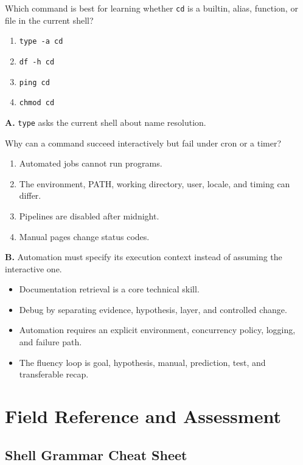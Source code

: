 \documentclass[11pt,oneside,openany]{book}
\newcommand{\fourchoices}[4]{%
  \begin{enumerate}[label=\Alph*),leftmargin=2em,itemsep=0.25em]
    \item #1
    \item #2
    \item #3
    \item #4
  \end{enumerate}}
\begin{document}
\begin{questionbox}[title={Medium 20.1 -- Discovery}]
Which command is best for learning whether \texttt{cd} is a builtin, alias, function, or file in the current shell?
\fourchoices{\texttt{type -a cd}}{\texttt{df -h cd}}{\texttt{ping cd}}{\texttt{chmod cd}}
\end{questionbox}
\begin{answerbox}
\textbf{A.} \texttt{type} asks the current shell about name resolution.
\end{answerbox}

\begin{questionbox}[title={Hard 20.2 -- Automation}]
Why can a command succeed interactively but fail under cron or a timer?
\fourchoices{Automated jobs cannot run programs.}{The environment, PATH, working directory, user, locale, and timing can differ.}{Pipelines are disabled after midnight.}{Manual pages change status codes.}
\end{questionbox}
\begin{answerbox}
\textbf{B.} Automation must specify its execution context instead of assuming the interactive one.
\end{answerbox}

\begin{recapbox}
\begin{itemize}
  \item Documentation retrieval is a core technical skill.
  \item Debug by separating evidence, hypothesis, layer, and controlled change.
  \item Automation requires an explicit environment, concurrency policy, logging, and failure path.
  \item The fluency loop is goal, hypothesis, manual, prediction, test, and transferable recap.
\end{itemize}
\end{recapbox}

\appendix
\part{Field Reference and Assessment}

\chapter{Shell Grammar Cheat Sheet}
\end{document}
